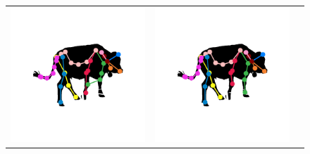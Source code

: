 \begin{figure}[t]
\begin{floatrow}
{\begin{tabular}{ccc}
    \includegraphics[trim={6cm 6cm 6cm 6cm},clip,height=\comparisonheight]{ga_vs_qp/0069_skel_sil_raw.png}
        &
    \includegraphics[trim={6cm 6cm 6cm 6cm},clip,height=\comparisonheight]{ga_vs_qp/0069_skel_sil_cleaned_qp.png}

\end{tabular}}
\end{floatrow}
\end{figure}
